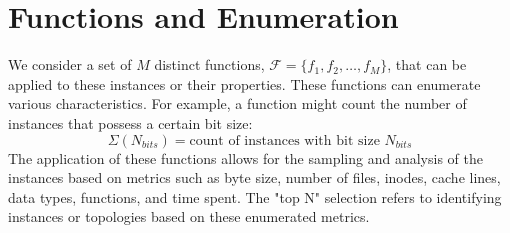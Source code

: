 \section{Functions and Enumeration}
We consider a set of $M$ distinct functions, $\mathcal{F} = \{f_1, f_2, \ldots, f_M\}$, that can be applied to these instances or their properties. These functions can enumerate various characteristics. For example, a function might count the number of instances that possess a certain bit size:
\[ \Sigma(N_{bits}) = \text{count of instances with bit size } N_{bits} \]
The application of these functions allows for the sampling and analysis of the instances based on metrics such as byte size, number of files, inodes, cache lines, data types, functions, and time spent. The "top N" selection refers to identifying instances or topologies based on these enumerated metrics.
